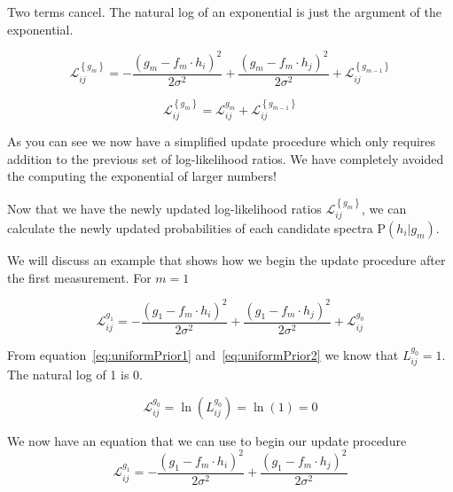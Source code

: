 \noindent Two terms cancel. The natural log of an exponential is just the argument of the exponential.

\begin{equation}\label{eq:LLRUpdate}
    \mathscr{L}_{ij}^{\left\{g_m\right\}}
    =
    -
    \frac
    {
        \left( g_m - f_m \cdot {h}_i \right)^2
    }
    {
        2 \sigma^2
    }
    +
    \frac
    {
        \left( g_m - f_m \cdot {h}_j \right)^2
    }
    {
        2 \sigma^2
    }
    +
    \mathscr{L}_{ij}^{\left\{g_{m-1}\right\}}
\end{equation}

\begin{equation}\label{eq:LLRUpdate}
    \boxed{
        \mathscr{L}_{ij}^{\left\{g_m\right\}}
        =
        \mathscr{L}_{ij}^{g_m}
        +
        \mathscr{L}_{ij}^{\left\{g_{m-1}\right\}}
    }
\end{equation}


\noindent As you can see we now have a simplified update procedure which only requires addition to the previous set of log-likelihood ratios. We have completely avoided the computing the exponential of larger numbers!

Now that we have the newly updated log-likelihood ratios $ \mathscr{L}_{ij}^{\left\{g_m\right\}} $, we can calculate the newly updated probabilities of each candidate spectra $\mbox{P}({h}_i | {g_m})$.

We will discuss an example that shows how we begin the update procedure after the first measurement. For $m = 1$

\begin{equation}
    \mathscr{L}_{ij}^{g_1}
    =
    -
    \frac
    {
        \left( g_1 - f_m \cdot {h}_i \right)^2
    }
    {
        2 \sigma^2
    }
    +
    \frac
    {
        \left( g_1 - f_m \cdot {h}_j \right)^2
    }
    {
        2 \sigma^2
    }
    +
    \mathscr{L}_{ij}^{g_{0}}
\end{equation}


\noindent From equation~\ref{eq:uniformPrior1} and~\ref{eq:uniformPrior2} we know that $L_{ij}^{g_{0}} = 1$. The natural log of 1 is 0.

\begin{equation}
    \mathscr{L}_{ij}^{g_{0}}
    =
    \ln{
    \left(
        L_{ij}^{g_{0}}
    \right)
    }
    =
    \ln{
    \left(
        1
    \right)
    }
    =
    0
\end{equation}

\noindent We now have an equation that we can use to begin our update procedure
\begin{equation}
    \mathscr{L}_{ij}^{g_1}
    =
    -
    \frac
    {
        \left( g_1 - f_m \cdot {h}_i \right)^2
    }
    {
        2 \sigma^2
    }
    +
    \frac
    {
        \left( g_1 - f_m \cdot {h}_j \right)^2
    }
    {
        2 \sigma^2
    }
\end{equation}





